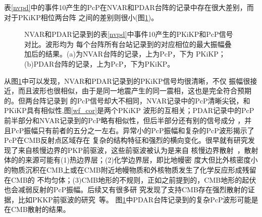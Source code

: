 表\ref{nvpd}中的事件10产生的PcP在NVAR和PDAR台阵的记录中存在很大差别，而对于PKiKP相位两台阵
之间的差别则很小(图\ref{amp_comp_nvpd_4371355})。

\begin{figure}[!ht]
	\hfill{}
	\hfill{}
	\hfill{}
	\caption{NVAR和PDAR记录到的表\ref{nvpd}中事件10产生的PKiKP和PcP信号对比。波形均为%
每个台阵所有台站记录到的对应相位的最大振幅叠加后的结果。(a)为NVAR台阵的记录，上为PcP，下为%
PKiKP；(b)PDAR台阵的记录，上为PcP，下为PKiKP。}
	\label{amp_comp_nvpd_4371355}
\end{figure}
	
	从图\ref{amp_comp_nvpd_4371355}中可以发现，NVAR和PDAR记录到的PKiKP信号均很清晰，不仅
振幅很接近，而且波形也很相似，由于是同一地震产生的同一震相，这也是完全符合预期的。但两台阵记录到
的PcP信号却大不相同，NVAR记录中的PcP清晰尖锐，和PKiKP具有相似性,图\ref{wf_cor}是两个PKiKP
波形的互相关；PDAR记录中的PcP前半部分和NVAR记录到的PcP略有相似性，但后半部分还有别的信号成分
，并且PcP振幅只有前者的五分之一左右。异常小的PcP振幅和复杂的PcP波形揭示了PcP在CMB反射点区域存在
复杂的结构特征和强烈的横向变化。很早就有研究发现了来自核慢边界的PKP前驱波，这些前驱波被认为是来自
核慢边界散射~\citep{Bataille1988}，散射体的的来源可能有(1)热边界层；(2)化学边界层，即比地幔密
度大但比外核密度小的物质沉积在CMB上或在CMB附近地幔物质和外核物质发生了化学反应形成残留在CMB的
不均匀体；(3)CMB地形的不规则，正如之前提到的，CMB地形的起伏也会减弱反射的PcP振幅。后续又有很多研
究发现了支持CMB存在强烈散射的证据，比如PKKP前驱波的研究~\citep{Rost2010616}等。
图\ref{amp_comp_nvpd_4371355}中PDAR台阵记录到的复杂PcP波形可能是在CMB散射的结果。


